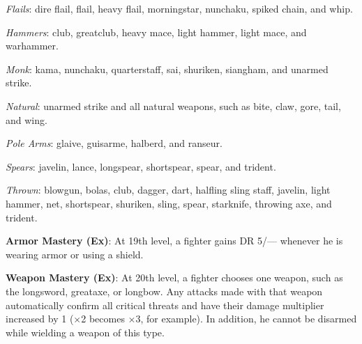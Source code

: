 \textit{Flails}: dire flail, flail, heavy flail, morningstar, nunchaku, spiked chain, and whip.

\textit{Hammers}: club, greatclub, heavy mace, light hammer, light mace, and warhammer.

\textit{Monk}: kama, nunchaku, quarterstaff, sai, shuriken, siangham, and unarmed strike.

\textit{Natural}: unarmed strike and all natural weapons, such as bite, claw, gore, tail, and wing.

\textit{Pole Arms}: glaive, guisarme, halberd, and ranseur.

\textit{Spears}: javelin, lance, longspear, shortspear, spear, and trident.

\textit{Thrown}: blowgun, bolas, club, dagger, dart, halfling sling staff, javelin, light hammer, net,
    shortspear, shuriken, sling, spear, starknife, throwing axe, and trident.

\textbf{Armor Mastery (Ex)}: At 19th level, a fighter gains DR 5/--- whenever he is wearing armor or using a shield.

\textbf{Weapon Mastery (Ex)}: At 20th level, a fighter chooses one weapon, such as the longsword, greataxe, 
    or longbow. Any attacks made with that weapon automatically confirm all critical threats and have their
    damage multiplier increased by 1 (\mbox{$\times$}2 becomes \mbox{$\times$}3, for example). In addition,
    he cannot be disarmed while wielding a weapon of this type.